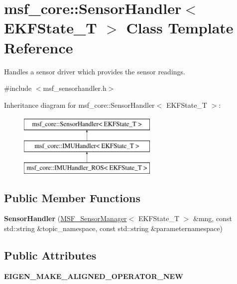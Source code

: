 \hypertarget{classmsf__core_1_1SensorHandler}{\section{msf\-\_\-core\-:\-:Sensor\-Handler$<$ E\-K\-F\-State\-\_\-\-T $>$ Class Template Reference}
\label{classmsf__core_1_1SensorHandler}
}


Handles a sensor driver which provides the sensor readings.  




{\ttfamily \#include $<$msf\-\_\-sensorhandler.\-h$>$}

Inheritance diagram for msf\-\_\-core\-:\-:Sensor\-Handler$<$ E\-K\-F\-State\-\_\-\-T $>$\-:\begin{figure}[H]
\begin{center}
\leavevmode
\includegraphics[height=3.000000cm]{classmsf__core_1_1SensorHandler}
\end{center}
\end{figure}
\subsection*{Public Member Functions}
\begin{DoxyCompactItemize}
\item 
\hypertarget{classmsf__core_1_1SensorHandler_aba1cd2f28ff92d5005ab7ad006e20023}{{\bfseries Sensor\-Handler} (\hyperlink{classmsf__core_1_1MSF__SensorManager}{M\-S\-F\-\_\-\-Sensor\-Manager}$<$ E\-K\-F\-State\-\_\-\-T $>$ \&mng, const std\-::string \&topic\-\_\-namespace, const std\-::string \&parameternamespace)}\label{classmsf__core_1_1SensorHandler_aba1cd2f28ff92d5005ab7ad006e20023}

\end{DoxyCompactItemize}
\subsection*{Public Attributes}
\begin{DoxyCompactItemize}
\item 
\hypertarget{classmsf__core_1_1SensorHandler_ab25601f461c0c7e0e898f8eb200ec2b6}{{\bfseries E\-I\-G\-E\-N\-\_\-\-M\-A\-K\-E\-\_\-\-A\-L\-I\-G\-N\-E\-D\-\_\-\-O\-P\-E\-R\-A\-T\-O\-R\-\_\-\-N\-E\-W}}\label{classmsf__core_1_1SensorHandler_ab25601f461c0c7e0e898f8eb200ec2b6}

\end{DoxyCompactItemize}
